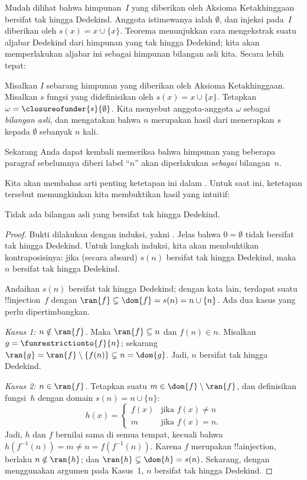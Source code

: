 \documentclass[../../../include/open-logic-section]{subfiles}
\begin{document}
Mudah dilihat bahwa himpunan~$I$ yang diberikan oleh Aksioma Ketakhinggaan
bersifat tak hingga Dedekind. Anggota istimewanya ialah $\emptyset$, dan
injeksi pada~$I$ diberikan oleh $s(x)=x\cup\{x\}$. Teorema
 menunjukkan cara
mengekstrak suatu aljabar Dedekind dari himpunan yang tak hingga Dedekind;
kita akan memperlakukan aljabar ini sebagai himpunan bilangan asli kita.
Secara lebih tepat:
\begin{defn}
Misalkan $I$ sebarang himpunan yang diberikan oleh Aksioma Ketakhinggaan.
Misalkan $s$ fungsi yang didefinisikan oleh $s(x)=x\cup\{x\}$. Tetapkan
$\omega=\closureofunder{s}{\emptyset}$. Kita menyebut anggota-anggota
$\omega$ sebagai \emph{bilangan asli}, dan mengatakan bahwa $n$ merupakan
hasil dari menerapkan $s$ kepada $\emptyset$ sebanyak $n$ kali.
\end{defn}

Sekarang Anda dapat kembali memeriksa bahwa himpunan yang beberapa paragraf
sebelumnya diberi label ``$n$'' akan diperlakukan \emph{sebagai} bilangan~$n$.

Kita akan membahas arti penting ketetapan ini dalam
. Untuk saat ini, ketetapan tersebut memungkinkan
kita membuktikan hasil yang intuitif:

\begin{prop}
Tidak ada bilangan asli yang bersifat tak hingga Dedekind.
\end{prop}

\begin{proof}
Bukti dilakukan dengan induksi, yakni
. Jelas bahwa
$0=\emptyset$ tidak bersifat tak hingga Dedekind. Untuk langkah induksi, kita
akan membuktikan kontraposisinya: jika (secara absurd) $s(n)$ bersifat tak
hingga Dedekind, maka $n$ bersifat tak hingga Dedekind.

Andaikan $s(n)$ bersifat tak hingga Dedekind; dengan kata lain, terdapat suatu
!!{injection}~$f$ dengan $\ran{f}\subsetneq\dom{f}=s(n)=n\cup\{n\}$. Ada dua
kasus yang perlu dipertimbangkan.

\emph{Kasus 1: $n\notin\ran{f}$.} Maka $\ran{f}\subseteq n$ dan
$f(n)\in n$. Misalkan $g=\funrestrictionto{f}{n}$; sekarang
$\ran{g}=\ran{f}\setminus\{f(n)\}\subsetneq n=\dom{g}$. Jadi, $n$ bersifat
tak hingga Dedekind.

\emph{Kasus 2: $n\in\ran{f}$.} Tetapkan suatu
$m\in\dom{f}\setminus\ran{f}$, dan definisikan fungsi~$h$ dengan domain
$s(n)=n\cup\{n\}$:
\[
h(x) = 
	\begin{cases}
		f(x) & \text{jika }f(x) \neq n\\
		m & \text{jika }f(x)=n.
	\end{cases}
\]
Jadi, $h$ dan $f$ bernilai sama di semua tempat, kecuali bahwa
$h(f^{-1}(n))=m\neq n=f(f^{-1}(n))$. Karena $f$
merupakan !!a{injection}, berlaku $n\notin\ran{h}$; dan
$\ran{h}\subsetneq\dom{h}=s(n)$. Sekarang, dengan menggunakan argumen pada
Kasus~1, $n$ bersifat tak hingga Dedekind.
\end{proof}
\end{document}
